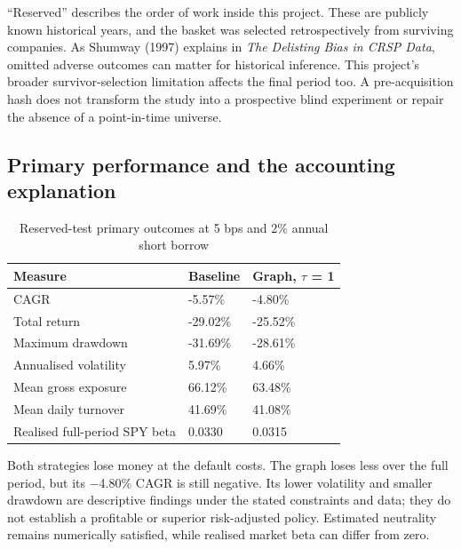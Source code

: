 \documentclass[12pt,a4paper,oneside]{article}
\begin{document}
“Reserved” describes the order of work inside this project. These are publicly known historical years, and the basket was selected retrospectively from surviving companies. As Shumway (1997) explains in \textit{The Delisting Bias in CRSP Data}, omitted adverse outcomes can matter for historical inference. This project's broader survivor-selection limitation affects the final period too. A pre-acquisition hash does not transform the study into a prospective blind experiment or repair the absence of a point-in-time universe.


\subsection{Primary performance and the accounting explanation}

\begingroup
\setcounter{table}{18}
\fontsize{10}{12.5}\selectfont
\renewcommand{\arraystretch}{1.12}
\begin{table}[!htbp]
\centering
{}\fontsize{10}{12.5}\selectfont
\begin{tabular}{P{0.460000\dimexpr{}\tabcolsep\relax}Q{0.270000\dimexpr{}\tabcolsep\relax}Q{0.270000\dimexpr{}\tabcolsep\relax}}
\toprule
{} \textbf{Measure} & \textbf{Baseline} & \textbf{Graph, \(\tau\) = 1} \\ \midrule
CAGR & -5.57\% & -4.80\% \\
\midrule[0.2pt]
Total return & -29.02\% & -25.52\% \\
\midrule[0.2pt]
Maximum drawdown & -31.69\% & -28.61\% \\
\midrule[0.2pt]
Annualised volatility & 5.97\% & 4.66\% \\
\midrule[0.2pt]
Mean gross exposure & 66.12\% & 63.48\% \\
\midrule[0.2pt]
Mean daily turnover & 41.69\% & 41.08\% \\
\midrule[0.2pt]
Realised full-period SPY beta & 0.0330 & 0.0315 \\
\bottomrule
\end{tabular}
\caption{Reserved-test primary outcomes at 5 bps and 2\% annual short borrow}\label{tab:19}
\end{table}
\endgroup

Both strategies lose money at the default costs. The graph loses less over the full period, but its \( - \)4.80\% CAGR is still negative. Its lower volatility and smaller drawdown are descriptive findings under the stated constraints and data; they do not establish a profitable or superior risk-adjusted policy. Estimated neutrality remains numerically satisfied, while realised market beta can differ from zero.
\end{document}
